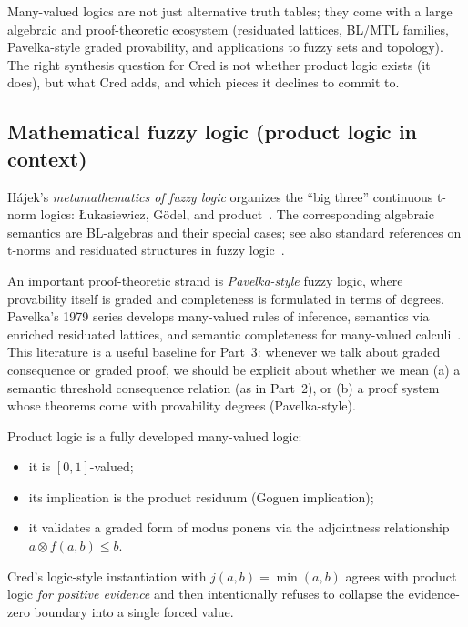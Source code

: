 \documentclass[11pt,a4paper]{article}
\newcommand{\conjc}{\otimes}
\begin{document}
Many-valued logics are not just alternative truth tables; they come with a large
algebraic and proof-theoretic ecosystem (residuated lattices, BL/MTL families,
Pavelka-style graded provability, and applications to fuzzy sets and topology).
The right synthesis question for Cred is not whether product logic exists (it
does), but what Cred adds, and which pieces it declines to commit to.

\subsection{Mathematical fuzzy logic (product logic in context)}

H\'ajek's \emph{metamathematics of fuzzy logic} organizes the ``big three''
continuous t-norm logics: \L ukasiewicz, G\"odel, and product~\cite{hajek1998}.
The corresponding algebraic semantics are BL-algebras and their special cases;
see also standard references on t-norms and residuated structures
in fuzzy logic~\cite{klement2000,bergmann2008,cintula2011,galatos2007}.

An important proof-theoretic strand is \emph{Pavelka-style} fuzzy logic, where
provability itself is graded and completeness is formulated in terms of degrees.
Pavelka's 1979 series develops many-valued rules of inference, semantics via
enriched residuated lattices, and semantic completeness for many-valued
calculi~\cite{pavelka1979i,pavelka1979ii,pavelka1979iii}.  This literature is a
useful baseline for Part~3: whenever we talk about graded consequence or graded
proof, we should be explicit about whether we mean (a) a semantic threshold
consequence relation (as in Part~2), or (b) a proof system whose theorems come
with provability degrees (Pavelka-style).

Product logic is a fully developed many-valued logic:
\begin{itemize}[nosep]
\item it is $[0,1]$-valued;
\item its implication is the product residuum (Goguen implication);
\item it validates a graded form of modus ponens via the adjointness
relationship $a\conjc f(a,b)\le b$.
\end{itemize}

Cred's logic-style instantiation with $j(a,b)=\min(a,b)$ agrees with product
logic \emph{for positive evidence} and then intentionally refuses to collapse
the evidence-zero boundary into a single forced value.
\end{document}
